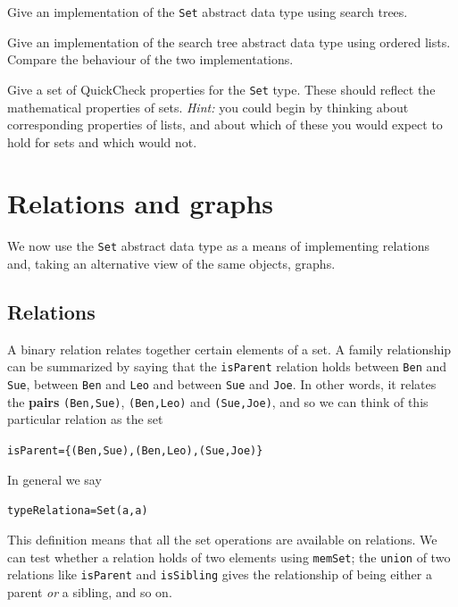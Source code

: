 \begin{exercises}
\item
Give an implementation of the \texttt{Set} abstract data type using search trees.

\item
Give an implementation of the search tree abstract data type using ordered lists. Compare
the behaviour of the two implementations.


\item
Give a set of QuickCheck properties for the \texttt{Set} type. These should reflect the mathematical properties of sets. \emph{Hint:} you could begin by thinking about corresponding properties of lists, and about which of these you would expect to hold for sets and which would not.



\end{exercises}

\section{Relations and graphs}
\label{rels}


We now use the \texttt{Set} abstract data type as a means of implementing relations and,
taking an alternative view of the same objects, graphs.
\vspace{-5pt}

\subsection*{Relations}

A binary relation
relates together certain elements of a set. A family
relationship
can be summarized by saying that
the \texttt{isParent} relation holds between \texttt{Ben} and \texttt{Sue}, between
\texttt{Ben} and \texttt{Leo} and between \texttt{Sue} and \texttt{Joe}. In other
words, it relates the \textbf{pairs} \texttt{(Ben,Sue)}, \texttt{(Ben,Leo)} and 
\texttt{(Sue,Joe)}, and so we can think of this particular relation as the set
\begin{alltt}
isParent = \{(Ben,Sue) , (Ben,Leo) , (Sue,Joe)\}
\end{alltt}
In general we say
\begin{alltt}
type Relation a = Set (a,a)
\end{alltt}
This definition means that all the set operations are available on relations.
We can test whether a relation holds of two elements using \texttt{memSet}; the
\texttt{union} of two relations like \texttt{isParent} and \texttt{isSibling} gives
the relationship of being either a parent {\em or\/} a sibling, and so on.

